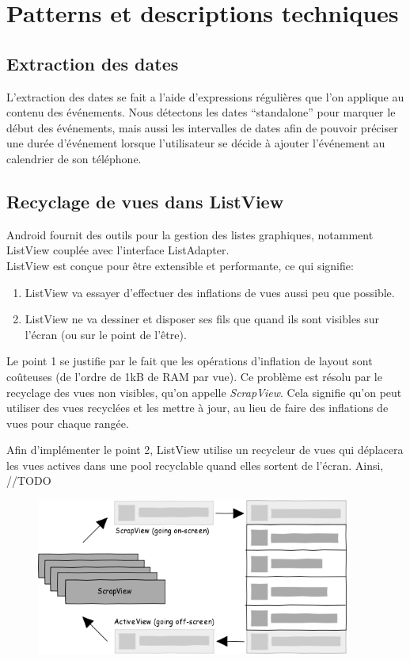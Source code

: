 \chapter{Patterns et descriptions techniques}

\section{Extraction des dates}
L’extraction des dates se fait a l’aide d’expressions régulières que l’on applique au contenu des événements. Nous détectons les dates “standalone” pour marquer le début des événements, mais aussi les intervalles de dates afin de pouvoir préciser une durée d’événement lorsque l’utilisateur se décide à ajouter l’événement au calendrier de son téléphone.

\section{Recyclage de vues dans ListView}
Android fournit des outils pour la gestion des listes graphiques, notamment ListView couplée avec l’interface ListAdapter.\\
ListView est conçue pour être extensible et performante, ce qui signifie:

\begin{enumerate}
\item ListView va essayer d’effectuer des inflations de vues aussi peu que possible.
\item ListView ne va dessiner et disposer ses fils que quand ils sont visibles sur l’écran (ou sur le point de l'être).
\end{enumerate}

Le point 1 se justifie par le fait que les opérations d’inflation de layout sont coûteuses (de l’ordre de 1kB de RAM par vue). Ce problème est résolu par le recyclage des vues non visibles, qu’on appelle \emph{ScrapView}. Cela signifie qu’on peut utiliser des vues recyclées et les mettre à jour, au lieu de faire des inflations de vues pour chaque rangée.

Afin d’implémenter le point 2, ListView utilise un recycleur de vues qui déplacera les vues actives dans une pool recyclable quand elles sortent de l’écran. Ainsi, //TODO

\begin{figure}[h]
  \center
  \includegraphics[width=0.92\textwidth]{resources/listview_recycling.png}
\end{figure}

